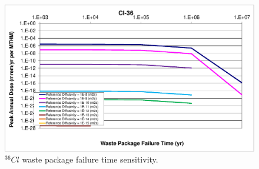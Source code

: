 \begin{figure}[ht!]
\begin{minipage}[b]{0.45\linewidth}
\includegraphics[width=\linewidth]{./chapters/nuclide_sensitivity/clay/WPFailExtended/Cl-36-WPFail.eps}
\caption{$^{36}Cl$ waste package failure time sensitivity. }
\label{fig:WPFailPuDaughters}

\end{minipage}
\end{figure}


